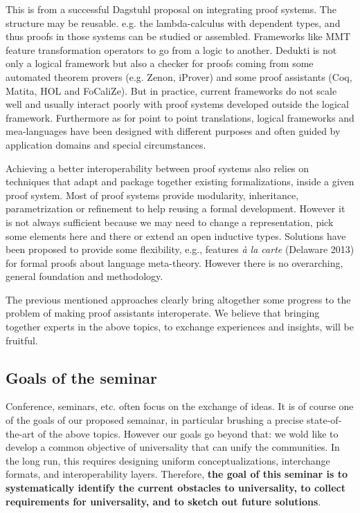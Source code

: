\begin{oldpart}{This is from a successful Dagstuhl proposal on integrating proof systems. The structure may be reusable.}
 e.g. the lambda-calculus with dependent types, and thus proofs in
 those systems can be studied or assembled. Frameworks like MMT
 feature transformation operators to go from a logic to
 another. Dedukti is not only a logical framework but also a checker
 for proofs coming from some automated theorem provers
(e.g. Zenon, iProver) and some proof assistants (Coq, Matita, HOL and
 FoCaliZe). But in practice, current
 frameworks do not scale well and usually interact poorly with
 proof systems developed outside the logical framework. Furthermore as
 for point to point translations, logical frameworks and mea-languages
 have been designed with different purposes and often guided by
 application domains and special circumstances.   

Achieving a better interoperability between proof systems also  
 relies on techniques that adapt and package together existing
 formalizations, inside a given proof system. Most of proof systems
 provide modularity, inheritance, parametrization or  refinement to
 help reusing a formal development. However it is not always
 sufficient because we may need to change a representation, pick some
 elements here and there or extend an open inductive types. Solutions
 have been proposed to provide some flexibility, e.g.,  features {\em \`a la
 carte} (Delaware 2013) for formal proofs about language
 meta-theory. However there is no
overarching, general foundation and methodology. 

%

The previous mentioned approaches clearly bring altogether some
progress  to the problem of   making proof assistants interoperate. We
believe that bringing together experts in the above topics,  
to exchange experiences and insights, will be fruitful.


\subsection{Goals of the seminar}

Conference, seminars, etc. often focus on the exchange of ideas. It is
of course one of the goals of our proposed semainar, in particular
brushing a precise state-of-the-art of the above topics. 
However our goals go beyond that: we wold like to develop a common
objective of universality that can unify the communities. In the long run, this requires designing uniform conceptualizations, interchange formats, and interoperability layers.
Therefore, \textbf{the goal of this seminar is to systematically identify the current obstacles to universality, to collect requirements for universality, and to sketch out future solutions}.


\end{oldpart}
